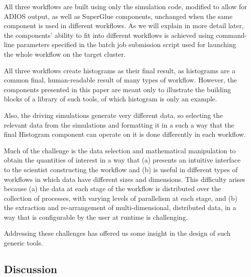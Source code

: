All three workflows are built using only the simulation code,
modified to allow for ADIOS output, as well as SuperGlue
components, unchanged when the same component is used
in different workflows.
As we will explain in more detail later,
the components' ability to fit
into different workflows
is achieved using command-line
parameters specified in the batch job
submission script used for launching
the whole workflow on the target cluster.

All three workflows create histograms as their final
result, as histograms are a common final,
human-readable result of many types of workflow.
However, the components presented in this paper
are meant only to illustrate the building blocks
of a library of such tools, of which histogram is
only an example.

Also, the driving simulations generate very
different data, so selecting the
relevant data from the simulations and
formatting it in a such a way that the
final Histogram component can operate on
it is done differently in each
workflow.

Much of the challenge is the data selection and mathematical
manipulation to obtain the quantities of
interest in a way that (a) presents an
intuitive interface to the scientist
constructing the workflow and (b) is
useful in different types of workflows
in which data have different sizes and
dimensions.  This difficulty arises
because (a) the data at each stage of the
workflow is distributed over the collection
of processes, with varying levels
of parallelism at each stage, and
(b) the extraction and
re-arrangement of multi-dimensional,
distributed data, in a way that is
configurable by the user at runtime is challenging. 

Addressing these challenges has offered us some insight
in the design of such generic tools.

\subsection{Discussion}

